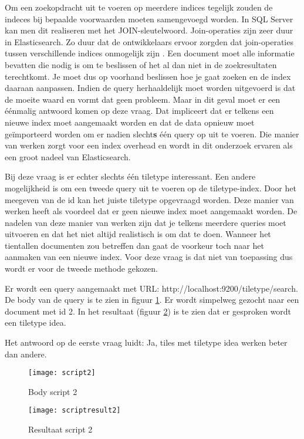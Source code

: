 Om een zoekopdracht uit te voeren op meerdere indices tegelijk zouden de indeces bij bepaalde voorwaarden moeten samengevoegd worden. In SQL Server kan men dit realiseren met het JOIN-sleutelwoord. Join-operaties zijn zeer duur in Elasticsearch. Zo duur dat de ontwikkelaars ervoor zorgden dat join-operaties tussen verschillende indices onmogelijk zijn \autocite{Elasticsearch}. Een document moet alle informatie bevatten die nodig is om te beslissen of het al dan niet in de zoekresultaten terechtkomt. Je moet dus op voorhand beslissen hoe je gaat zoeken en de index daaraan aanpassen. Indien de query herhaaldelijk moet worden uitgevoerd is dat de moeite waard en vormt dat geen probleem. Maar in dit geval moet er een  éénmalig antwoord komen op deze vraag. Dat impliceert dat er telkens een nieuwe index moet aangemaakt worden en dat de data opnieuw moet geïmporteerd worden om er nadien slecht\textbf{s} één query op uit te voeren. Die manier van werken zorgt voor een index overhead en wordt in dit onderzoek ervaren als een groot nadeel van Elasticsearch.

Bij deze vraag is er echter slechts één tiletype interessant. Een andere mogelijkheid is om een tweede query uit te voeren op de tiletype-index. Door het meegeven van de id kan het juiste tiletype opgevraagd worden. Deze manier van werken heeft als voordeel dat er geen nieuwe index moet aangemaakt worden. De nadelen van deze manier van werken zijn dat je telkens meerdere queries moet uitvoeren en dat het niet altijd realistisch is om dat te doen. Wanneer het tientallen documenten zou betreffen dan gaat de voorkeur toch naar het aanmaken van een nieuwe index. Voor deze vraag is dat niet van toepassing dus wordt er voor de tweede methode gekozen.

Er wordt een query aangemaakt met URL: http://localhost:9200/tiletype/\textunderscore search. De body van de query is te zien in figuur \ref{fig:script2}. Er wordt simpelweg gezocht naar een document met id 2. In het resultaat (figuur \ref{fig:scriptresult2}) is te zien dat er gesproken wordt een tiletype idea.

Het antwoord op de eerste vraag luidt: Ja, tiles met tiletype idea werken beter dan andere.

\begin{figure}
	\centering
	\texttt{[image: script2]}
	\caption{Body script 2}
	\label{fig:script2}
\end{figure}

\begin{figure}
	\centering
	\texttt{[image: scriptresult2]}
	\caption{Resultaat script 2}
	\label{fig:scriptresult2}
\end{figure}


